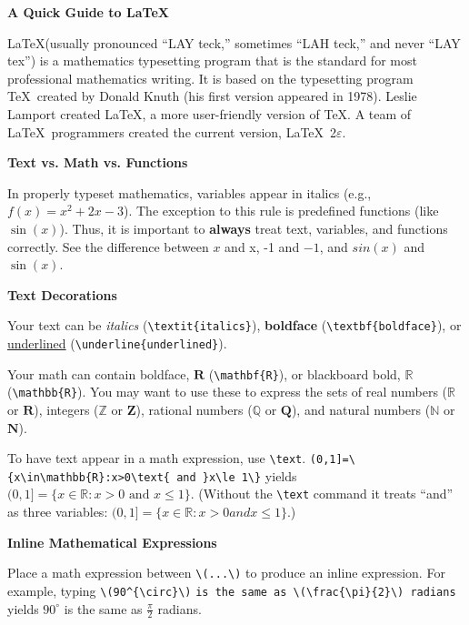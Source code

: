 \documentclass[10pt,landscape]{article}
\newcommand{\ColorSection}[1]{\par\vspace{1.5ex}\noindent\textcolor{sectioncolor}{\Large\bfseries #1}\par\vspace{0.75ex}}
\newcommand{\ColorSubsection}[1]{\par\vspace{1ex}\noindent\textcolor{subsectioncolor}{\normalsize\bfseries #1}\par\vspace{0.5ex}}
\begin{document}
\raggedright
\footnotesize


\begin{center}
\textcolor{titlecolor}{\Huge\bfseries A Quick Guide to \LaTeX}
\end{center}
\begin{multicols}{3}
\setlength{\premulticols}{1pt}
\setlength{\postmulticols}{1pt}
\setlength{\multicolsep}{1pt}
\setlength{\columnsep}{2pt}


\begin{tcolorbox}[notebox, title=What is \LaTeX?]
\LaTeX (usually pronounced ``LAY teck,'' sometimes ``LAH teck,'' and never ``LAY tex'') is a mathematics typesetting program that is the standard for most professional mathematics writing. It is based on the typesetting program \TeX\ created by Donald Knuth (his first version appeared in 1978). Leslie Lamport created \LaTeX, a more user-friendly version of \TeX. A team of \LaTeX\ programmers created the current version,  \LaTeX~2\(\varepsilon\).
\end{tcolorbox}



\ColorSection{Text vs. Math vs. Functions}
In properly typeset mathematics, variables appear in italics (e.g., \(f(x)=x^{2}+2x-3\)). The exception to this rule is predefined functions (like \(\sin (x)\)). Thus, it is important to \textbf{always} treat text, variables, and functions correctly. See the difference between \(x\) and x, -1 and \(-1\), and \(sin(x)\) and \(\sin(x)\).  

\ColorSubsection{Text Decorations}
Your text can be \textit{italics} (\verb!\textit{italics}!), \textbf{boldface} (\verb!\textbf{boldface}!), or \underline{underlined} (\verb!\underline{underlined}!).

Your math can contain boldface, \(\mathbf{R}\) (\verb!\mathbf{R}!), or blackboard bold, \(\mathbb{R}\) (\verb!\mathbb{R}!). You may want to use these to express the sets of real numbers (\(\mathbb{R}\) or \(\mathbf{R}\)), integers (\(\mathbb{Z}\) or \(\mathbf{Z}\)), rational numbers (\(\mathbb{Q}\) or \(\mathbf{Q}\)), and natural numbers (\(\mathbb{N}\) or \(\mathbf{N}\)).

To have text appear in a math expression, use \verb!\text!. \verb!(0,1]=\{x\in\mathbb{R}:x>0\text{ and }x\le 1\}! yields \((0,1]=\{x\in\mathbb{R}:x>0\text{ and }x\le 1\}\). (Without the \verb!\text! command it treats ``and'' as three variables: \((0,1]=\{x\in\mathbb{R}:x>0 and x\le 1\}\).)

\ColorSubsection{Inline Mathematical Expressions}
Place a math expression between \verb!\(...\)! to produce an inline expression.  For example, typing \verb!\(90^{\circ}\)! \verb!is the same as \(\frac{\pi}{2}\) radians!  yields \(90^{\circ}\) is the same as \(\frac{\pi}{2}\) radians.


\end{multicols}
\end{document}
